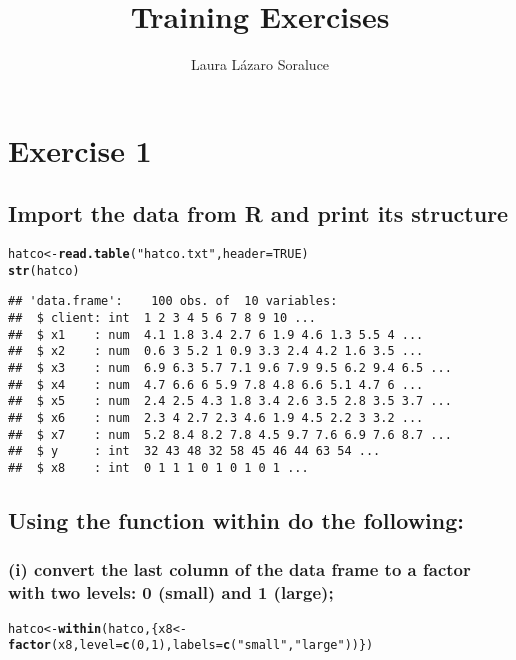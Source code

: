 \documentclass{article}\usepackage[]{graphicx}\usepackage[]{xcolor}
\title{Training Exercises}
\author{Laura Lázaro Soraluce}
\makeatletter
\newcommand{\hlnum}[1]{\textcolor[rgb]{0.686,0.059,0.569}{#1}}%
\newcommand{\hlsng}[1]{\textcolor[rgb]{0.192,0.494,0.8}{#1}}%
\newcommand{\hldef}[1]{\textcolor[rgb]{0.345,0.345,0.345}{#1}}%
\newcommand{\hlkwb}[1]{\textcolor[rgb]{0.69,0.353,0.396}{#1}}%
\newcommand{\hlkwc}[1]{\textcolor[rgb]{0.333,0.667,0.333}{#1}}%
\newcommand{\hlkwd}[1]{\textcolor[rgb]{0.737,0.353,0.396}{\textbf{#1}}}%
\newenvironment{kframe}{%
 \def\at@end@of@kframe{}%
 \ifinner\ifhmode%
  \def\at@end@of@kframe{\end{minipage}}%
  \begin{minipage}{\columnwidth}%
 \fi\fi%
 \def\FrameCommand##1{\hskip\@totalleftmargin \hskip-\fboxsep
 \colorbox{shadecolor}{##1}\hskip-\fboxsep
     \hskip-\linewidth \hskip-\@totalleftmargin \hskip\columnwidth}%
 \MakeFramed {\advance\hsize-\width
   \@totalleftmargin\z@ \linewidth\hsize
   \@setminipage}}%
 {\par\unskip\endMakeFramed%
 \at@end@of@kframe}
\newenvironment{knitrout}{}{} %
\makeatother
\begin{document}
\maketitle
\section{Exercise 1}
\subsection{Import the data from R and print its structure}
\begin{knitrout}
\color{fgcolor}\begin{kframe}
\begin{alltt}
\hldef{hatco}\hlkwb{<-}\hlkwd{read.table}\hldef{(}\hlsng{"hatco.txt"}\hldef{,} \hlkwc{header}\hldef{=}\hlnum{TRUE}\hldef{)}
\hlkwd{str}\hldef{(hatco)}
\end{alltt}
\begin{verbatim}
## 'data.frame':	100 obs. of  10 variables:
##  $ client: int  1 2 3 4 5 6 7 8 9 10 ...
##  $ x1    : num  4.1 1.8 3.4 2.7 6 1.9 4.6 1.3 5.5 4 ...
##  $ x2    : num  0.6 3 5.2 1 0.9 3.3 2.4 4.2 1.6 3.5 ...
##  $ x3    : num  6.9 6.3 5.7 7.1 9.6 7.9 9.5 6.2 9.4 6.5 ...
##  $ x4    : num  4.7 6.6 6 5.9 7.8 4.8 6.6 5.1 4.7 6 ...
##  $ x5    : num  2.4 2.5 4.3 1.8 3.4 2.6 3.5 2.8 3.5 3.7 ...
##  $ x6    : num  2.3 4 2.7 2.3 4.6 1.9 4.5 2.2 3 3.2 ...
##  $ x7    : num  5.2 8.4 8.2 7.8 4.5 9.7 7.6 6.9 7.6 8.7 ...
##  $ y     : int  32 43 48 32 58 45 46 44 63 54 ...
##  $ x8    : int  0 1 1 1 0 1 0 1 0 1 ...
\end{verbatim}
\end{kframe}
\end{knitrout}

\subsection{Using the function within do the following: }
\subsubsection{(i) convert the last column of the data frame to a factor with two levels: 0 (small) and 1 (large);}
\begin{knitrout}
\color{fgcolor}\begin{kframe}
\begin{alltt}
\hldef{hatco}\hlkwb{<-}\hlkwd{within}\hldef{(hatco, \{x8}\hlkwb{<-}\hlkwd{factor}\hldef{(x8,} \hlkwc{level}\hldef{=}\hlkwd{c}\hldef{(}\hlnum{0}\hldef{,}\hlnum{1}\hldef{),} \hlkwc{labels}\hldef{=}\hlkwd{c}\hldef{(}\hlsng{"small"}\hldef{,} \hlsng{"large"}\hldef{))\})}
\end{alltt}
\end{kframe}
\end{knitrout}
\end{document}

